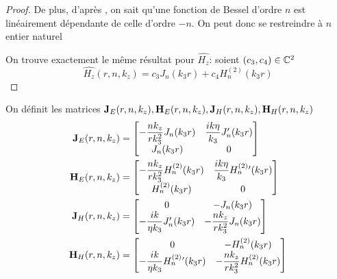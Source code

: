 \begin{proof}
    De plus, d'après \cite[p.~358]{abramowitz_handbook_1964}, on sait qu'une fonction de Bessel d'ordre \(n\) est linéairement dépendante de celle d'ordre \(-n\).
    On peut donc se restreindre à \(n\) entier naturel

    On trouve exactement le même résultat pour \(\hat{H_z}\): soient \((c_3,c_4) \in \mathbb C^2\)
    \begin{equation}
      \hat{H_z}(r,n,k_z) = c_3 J_n\left(k_3r\right) + c_4 H_n^{(2)}\left(k_3r\right)
    \end{equation}
  \end{proof}


  \begin{defn}
    On définit les matrices \(\mathbf{J}_{E}(r,n,k_z),\mathbf{H}_{E}(r,n,k_z),\mathbf{J}_{H}(r,n,k_z),\mathbf{H}_{H}(r,n,k_z)\)
    \begin{align}
      \mathbf{J}_{E}(r,n,k_z) &=
      \begin{bmatrix}
        -\dfrac{nk_z}{rk_3^2}J_n(k_3r) & \dfrac{ik\eta}{k_3}J_n'(k_3r)
        \\
        J_n(k_3r) & 0
      \end{bmatrix}
      \\
      \mathbf{H}_{E}(r,n,k_z) &=
      \begin{bmatrix}
        -\dfrac{nk_z}{rk_3^2}H_n^{(2)}(k_3r) & \dfrac{ik\eta}{k_3}H_n^{(2)}{}'(k_3r)
        \\
        H_n^{(2)}(k_3r) & 0
      \end{bmatrix}
      \\
      \mathbf{J}_{H}(r,n,k_z) &=
      \begin{bmatrix}
        0 & -J_n(k_3r)
        \\
        -\dfrac{ik}{\eta k_3}J_n'(k_3r) & -\dfrac{nk_z}{rk_3^2}J_n(k_3r)
      \end{bmatrix}
      \\
      \mathbf{H}_{H}(r,n,k_z) &=
      \begin{bmatrix}
        0 & -H_n^{(2)}(k_3r)
        \\
        -\dfrac{ik}{\eta k_3}H_n^{(2)}{}'(k_3r) & -\dfrac{nk_z}{rk_3^2}H_n^{(2)}(k_3r)
      \end{bmatrix}
    \end{align}
  \end{defn}

